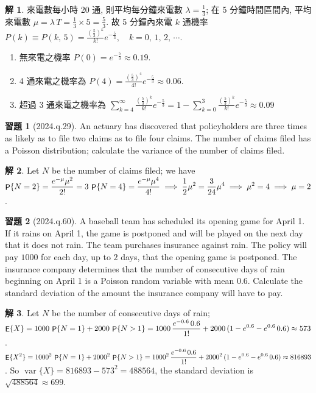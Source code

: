 \documentclass[12pt]{extarticle}
\newcommand{\ds}{\displaystyle}
\newcommand{\ie}{\;\Longrightarrow\;}
\DeclareMathOperator\prb{{\sf P}}
\DeclareMathOperator\expc{{\sf E}}
\DeclareMathOperator\var{var}
\theoremstyle{definition}
\newtheorem*{sol}{解}
\newtheorem*{exe}{習題}
\newcommand{\myline}{\noindent\makebox[\linewidth]{\rule{\paperwidth}{0.4pt}}}
\begin{document}
\begin{sol}
  來電數每小時 20 通, 則平均每分鐘來電數 $\lambda = \frac{1}{3}$; 在 5 分鐘時間區間內, 平均來電數 $\mu = \lambda\,T = \frac{1}{3}\times 5 = \frac{5}{3}$. 故 5 分鐘內來電 $k$ 通機率 $\ds P(k)\equiv P(k,\,5) = \frac{(\frac{5}{3})^k}{k!} e^{-\frac{5}{3}},\quad k=0,\,1,\,2,\,\cdots$.  
  \begin{enumerate}[label=(\alph*)]\setlength{\itemsep}{0pt}
    \item 無來電之機率 $\ds P(0)= e^{-\frac{5}{3}}\approx 0.19$.
    \item 4 通來電之機率為 $\ds P(4)=\frac{(\frac{5}{3})^4}{4!}e^{-\frac{5}{3}}\approx 0.06$. 
    \item 超過 3 通來電之機率為 $\ds\sum_{k=4}^{\infty}\frac{(\frac{5}{3})^k}{k!} e^{-\frac{5}{3}} = 1 - \sum_{k = 0}^3\frac{(\frac{5}{3})^k}{k!}e^{-\frac{5}{3}}\approx 0.09$
  \end{enumerate}
\end{sol}

\myline

\begin{exe}[2024.q.29]
  An actuary has discovered that policyholders are three times as likely as to file two claims as to file four claims. The number of claims filed has a Poisson distribution; calculate the variance of the number of claims filed.
\end{exe}

\begin{sol}
  Let $N$ be the number of claims filed; we have $\ds\prb\{N = 2\} = \frac{e^{-\mu}\mu^2}{2!} = 3\,\prb\{N = 4\} = \frac{e^{-\mu}\mu^4}{4!} \ie \frac{1}{2}\mu^2 = \frac{3}{24}\mu^4 \ie \mu^2 = 4 \ie \mu = 2$. 
\end{sol}

\begin{exe}[2024.q.60]
  A baseball team has scheduled its opening game for April 1. If it rains on April 1, the game is postponed and will be played on the next day that it does not rain. The team purchases insurance against rain. The policy will pay $1000$ for each day, up to $2$ days, that the opening game is postponed. The insurance company determines that the number of consecutive days of rain beginning on April 1 is a Poisson random variable with mean $0.6$. Calculate the standard deviation of the amount the insurance company will have to pay.
\end{exe}

\begin{sol}
  Let $N$ be the number of consecutive days of rain; $\ds\expc\{X\} = 1000\,\prb\{N = 1\} + 2000\,\prb\{N > 1\} = 1000\,\frac{e^{-0.6}\,0.6}{1!} + 2000\,(1 - e^{0.6} - e^{0.6}\,0.6) \approx 573$. $\ds\expc\{X^2\} = 1000^2\,\prb\{N = 1\} + 2000^2\,\prb\{N > 1\} = 1000^2\,\frac{e^{-0.6}\,0.6}{1!} + 2000^2\,(1 - e^{0.6} - e^{0.6}\,0.6) \approx 816893$. So $\var\{X\} = 816893 - 573^2 = 488564$, the standard deviation is $\sqrt{488564}\approx 699$.
\end{sol}
\end{document}
